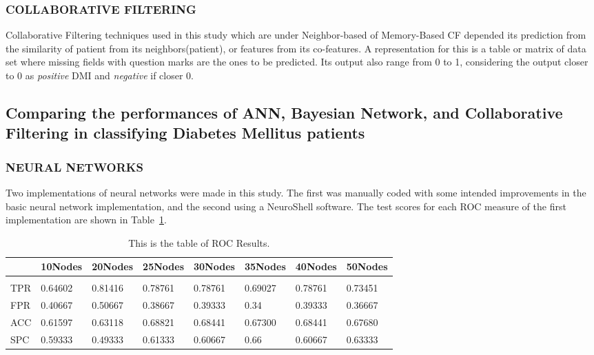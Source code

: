 \documentclass[journal]{./IEEE/IEEEtran}
\begin{document}
\subsubsection {COLLABORATIVE FILTERING}

	Collaborative Filtering techniques used in this study which are under Neighbor-based of  Memory-Based CF depended its prediction from the similarity of patient from its neighbors(patient), or features from its co-features. A representation for this is a table or matrix of data set where missing fields with question marks are the ones to be predicted. Its output also range from 0 to 1, considering the output closer to 0 as {\it positive} DMI and {\it negative} if closer 0. 

\subsection{Comparing the performances of ANN, Bayesian Network, and Collaborative Filtering in classifying Diabetes Mellitus patients}
\subsubsection {NEURAL NETWORKS}

Two implementations of neural networks were made in this study. The first was manually coded with some intended improvements in the basic neural network implementation, and the second using a NeuroShell software. The test scores for each ROC measure of the first implementation are shown in Table~\ref{table:one}.

\begin{table}[ht]
\caption{This is the table of ROC Results.} %
\tabcolsep=0.08cm
\begin{tabular}{llllllll}
\hline\hline %
~ & 10Nodes  & 20Nodes  & 25Nodes & 30Nodes  & 35Nodes  & 40Nodes  & 50Nodes \\
\hline \\[0.1ex]
 TPR & 0.64602 & 0.81416   &    0.78761    &    0.78761    &    0.69027    &    0.78761    &    0.73451    \\
    FPR     & 0.40667 &    0.50667    &    0.38667    &    0.39333    &    0.34         &    0.39333    &    0.36667    \\
    ACC     & 0.61597 &    0.63118    &    0.68821    &    0.68441    &    0.67300    &    0.68441    &    0.67680    \\
    SPC     &    0.59333      &    0.49333     &    0.61333     &    0.60667     & 0.66            &    0.60667     &    0.63333     \\
\hline
\end{tabular}
\label{table:one} %
\end{table}
\end{document}
